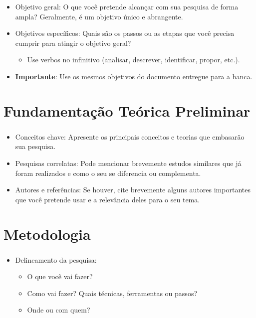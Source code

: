 \documentclass[aspectratio=169]{beamer}
\begin{document}
\begin{frame}[fragile]
	\frametitle{\secname}
	\begin{itemize}
		\item Objetivo geral: O que você pretende alcançar com sua pesquisa de forma ampla? Geralmente, é um objetivo único e abrangente.
		\item Objetivos específicos: Quais são os passos ou as etapas que você precisa cumprir para atingir o objetivo geral? 
		\begin{itemize}
			\item Use verbos no infinitivo (analisar, descrever, identificar, propor, etc.).
		\end{itemize}
		\item \textbf{Importante}: Use os mesmos objetivos do documento entregue para a banca.
	\end{itemize}
\end{frame}

\section{Fundamentação Teórica Preliminar}

\begin{frame}[fragile]
	\frametitle{\secname}
	\begin{itemize}
		\item Conceitos chave: Apresente os principais conceitos e teorias que embasarão sua pesquisa.
		\item Pesquisas correlatas: Pode mencionar brevemente estudos similares que já foram realizados e como o seu se diferencia ou complementa.
		\item Autores e referências: Se houver, cite brevemente alguns autores importantes que você pretende usar e a relevância deles para o seu tema.
	\end{itemize}
\end{frame}

\section{Metodologia}

\begin{frame}[fragile]
	\frametitle{\secname}
	\begin{itemize}
		\item Delineamento da pesquisa:
		\begin{itemize}
			\item O que você vai fazer?
			\item Como vai fazer? Quais técnicas, ferramentas ou passos?
			\item Onde ou com quem? 
		\end{itemize}		
	\end{itemize}
\end{frame}
\end{document}
